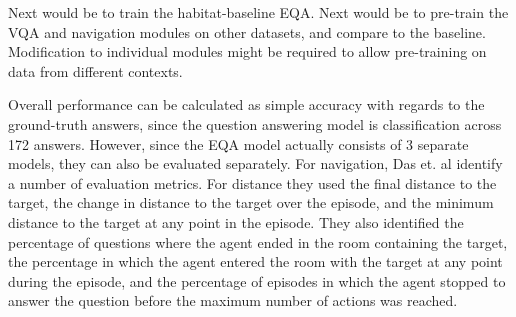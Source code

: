 \documentclass{article}
\begin{document}

Next would be to train the habitat-baseline EQA. Next would be to pre-train the VQA and navigation modules on other datasets, and compare to the baseline. Modification to individual modules might be required to allow pre-training on data from different contexts. 

Overall performance can be calculated as simple accuracy with regards to the ground-truth answers, since the question answering model is classification across 172 answers. However, since the EQA model actually consists of 3 separate models, they can also be evaluated separately. For navigation, Das et. al identify a number of evaluation metrics. For distance they used the final distance to the target, the change in distance to the target over the episode, and the minimum distance to the target at any point in the episode. They also identified the percentage of questions %
where the agent ended in the room containing the target, the percentage in which the agent entered the room with the target at any point during the episode, and the percentage of episodes in which the agent stopped to answer the question before the maximum number of actions was reached. 




\end{document}
